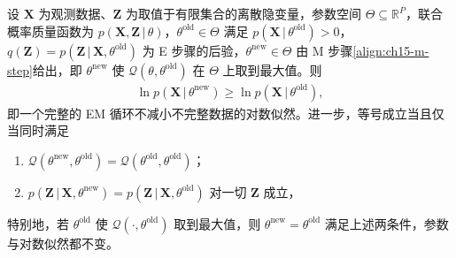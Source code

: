\documentclass[../../main.tex]{subfiles}
\begin{document}
\begin{theorem}[EM 算法的单调性]\label{theorem:ch15-EM单调性}
设 $\bm{X}$ 为观测数据、$\bm{Z}$ 为取值于有限集合的离散隐变量，参数空间 $\Theta\subseteq\mathbb{R}^{P}$，联合概率质量函数为 $p(\bm{X},\bm{Z}\,|\,\theta)$，$\theta^{\text{old}}\in\Theta$ 满足 $p(\bm{X}\,|\,\theta^{\text{old}})>0$，$q(\bm{Z})=p(\bm{Z}\,|\,\bm{X},\theta^{\text{old}})$ 为 E 步骤的后验，$\theta^{\text{new}}\in\Theta$ 由 M 步骤\eqref{align:ch15-m-step}给出，即 $\theta^{\text{new}}$ 使 $\mathcal{Q}(\theta,\theta^{\text{old}})$ 在 $\Theta$ 上取到最大值。则
\begin{align*}
\ln p(\bm{X}\,|\,\theta^{\text{new}})\geqslant\ln p(\bm{X}\,|\,\theta^{\text{old}}),
\end{align*}
即一个完整的 EM 循环不减小不完整数据的对数似然。进一步，等号成立当且仅当同时满足
\begin{enumerate}
\item $\mathcal{Q}(\theta^{\text{new}},\theta^{\text{old}})=\mathcal{Q}(\theta^{\text{old}},\theta^{\text{old}})$；
\item $p(\bm{Z}\,|\,\bm{X},\theta^{\text{new}})=p(\bm{Z}\,|\,\bm{X},\theta^{\text{old}})$ 对一切 $\bm{Z}$ 成立，
\end{enumerate}
特别地，若 $\theta^{\text{old}}$ 使 $\mathcal{Q}(\cdot,\theta^{\text{old}})$ 取到最大值，则 $\theta^{\text{new}}=\theta^{\text{old}}$ 满足上述两条件，参数与对数似然都不变。
\end{theorem}
\end{document}
